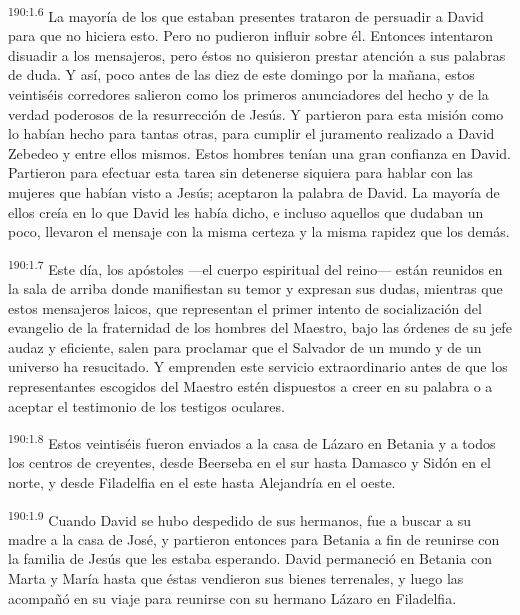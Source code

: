 \par 
\textsuperscript{190:1.6} La mayoría de los que estaban presentes trataron de persuadir a David para que no hiciera esto. Pero no pudieron influir sobre él. Entonces intentaron disuadir a los mensajeros, pero éstos no quisieron prestar atención a sus palabras de duda. Y así, poco antes de las diez de este domingo por la mañana, estos veintiséis corredores salieron como los primeros anunciadores del hecho y de la verdad poderosos de la resurrección de Jesús. Y partieron para esta misión como lo habían hecho para tantas otras, para cumplir el juramento realizado a David Zebedeo y entre ellos mismos. Estos hombres tenían una gran confianza en David. Partieron para efectuar esta tarea sin detenerse siquiera para hablar con las mujeres que habían visto a Jesús; aceptaron la palabra de David. La mayoría de ellos creía en lo que David les había dicho, e incluso aquellos que dudaban un poco, llevaron el mensaje con la misma certeza y la misma rapidez que los demás.

\par 
\textsuperscript{190:1.7} Este día, los apóstoles ---el cuerpo espiritual del reino--- están reunidos en la sala de arriba donde manifiestan su temor y expresan sus dudas, mientras que estos mensajeros laicos, que representan el primer intento de socialización del evangelio de la fraternidad de los hombres del Maestro, bajo las órdenes de su jefe audaz y eficiente, salen para proclamar que el Salvador de un mundo y de un universo ha resucitado. Y emprenden este servicio extraordinario antes de que los representantes escogidos del Maestro estén dispuestos a creer en su palabra o a aceptar el testimonio de los testigos oculares.

\par 
\textsuperscript{190:1.8} Estos veintiséis fueron enviados a la casa de Lázaro en Betania y a todos los centros de creyentes, desde Beerseba en el sur hasta Damasco y Sidón en el norte, y desde Filadelfia en el este hasta Alejandría en el oeste.

\par 
\textsuperscript{190:1.9} Cuando David se hubo despedido de sus hermanos, fue a buscar a su madre a la casa de José, y partieron entonces para Betania a fin de reunirse con la familia de Jesús que les estaba esperando. David permaneció en Betania con Marta y María hasta que éstas vendieron sus bienes terrenales, y luego las acompañó en su viaje para reunirse con su hermano Lázaro en Filadelfia.

